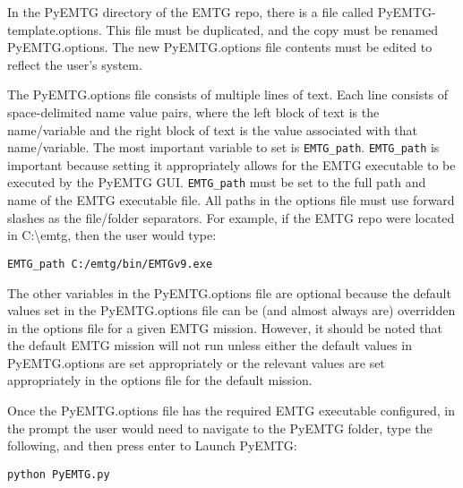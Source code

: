 
In the PyEMTG directory of the \ac{EMTG} repo, there is a file called PyEMTG-template.options. This file must be duplicated, and the copy must be renamed PyEMTG.options. The new PyEMTG.options file contents must be edited to reflect the user's system.

\noindent The PyEMTG.options file consists of multiple lines of text. Each line consists of space-delimited name value pairs, where the left block of text is the name/variable and the right block of text is the value associated with that name/variable. The most important variable to set is \texttt{EMTG\_path}. \texttt{EMTG\_path} is important because setting it appropriately allows for the \ac{EMTG} executable to be executed by the PyEMTG \ac{GUI}. \texttt{EMTG\_path} must be set to the full path and name of the \ac{EMTG} executable file. All paths in the options file must use forward slashes as the file/folder separators. For example, if the \ac{EMTG} repo were located in C:\textbackslash emtg, then the user would type:

\indent \verb|EMTG_path C:/emtg/bin/EMTGv9.exe|

\noindent The other variables in the PyEMTG.options file are optional because the default values set in the PyEMTG.options file can be (and almost always are) overridden in the options file for a given \ac{EMTG} mission. However, it should be noted that the default \ac{EMTG} mission will not run unless either the default values in PyEMTG.options are set appropriately or the relevant values are set appropriately in the options file for the default mission.

\noindent Once the PyEMTG.options file has the required EMTG executable configured, in the prompt the user would need to navigate to the PyEMTG folder, type the following, and then press enter to Launch PyEMTG:

\verb|python PyEMTG.py|